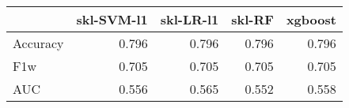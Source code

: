 \begin{tabular}{lrrrr}
\toprule
{} &  skl-SVM-l1 &  skl-LR-l1 &  skl-RF &  xgboost \\
\midrule
Accuracy &       0.796 &      0.796 &   0.796 &    0.796 \\
F1w      &       0.705 &      0.705 &   0.705 &    0.705 \\
AUC      &       0.556 &      0.565 &   0.552 &    0.558 \\
\bottomrule
\end{tabular}
